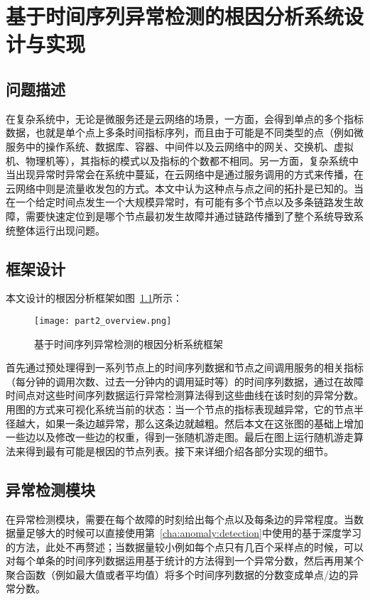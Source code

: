 
\chapter{基于时间序列异常检测的根因分析系统设计与实现}
\label{cha:root:cause:analysis}
\section{问题描述}
在复杂系统中，无论是微服务还是云网络的场景，一方面，会得到单点的多个指标数据，也就是单个点上多条时间指标序列，而且由于可能是不同类型的点（例如微服务中的操作系统、数据库、容器、中间件以及云网络中的网关、交换机、虚拟机、物理机等），其指标的模式以及指标的个数都不相同。另一方面，复杂系统中当出现异常时异常会在系统中蔓延，在云网络中是通过服务调用的方式来传播，在云网络中则是流量收发包的方式。本文中认为这种点与点之间的拓扑是已知的。当在一个给定时间点发生一个大规模异常时，有可能有多个节点以及多条链路发生故障，需要快速定位到是哪个节点最初发生故障并通过链路传播到了整个系统导致系统整体运行出现问题。

\section{框架设计}
本文设计的根因分析框架如图~\ref{fig:part2-overview}所示：
\begin{figure}[htbp]
    \centering
    \texttt{[image: part2\_overview.png]}
    \caption{基于时间序列异常检测的根因分析系统框架}
    \label{fig:part2-overview}
  \end{figure}

首先通过预处理得到一系列节点上的时间序列数据和节点之间调用服务的相关指标（每分钟的调用次数、过去一分钟内的调用延时等）的时间序列数据，通过在故障时间点对这些时间序列数据运行异常检测算法得到这些曲线在该时刻的异常分数。用图的方式来可视化系统当前的状态：当一个节点的指标表现越异常，它的节点半径越大，如果一条边越异常，那么这条边就越粗。然后本文在这张图的基础上增加一些边以及修改一些边的权重，得到一张随机游走图。最后在图上运行随机游走算法来得到最有可能是根因的节点列表。接下来详细介绍各部分实现的细节。
\section{异常检测模块}
\label{sec:anomaly:detection}
在异常检测模块，需要在每个故障的时刻给出每个点以及每条边的异常程度。当数据量足够大的时候可以直接使用第~\ref{cha:anomaly:detection}中使用的基于深度学习的方法，此处不再赘述；当数据量较小例如每个点只有几百个采样点的时候，可以对每个单条的时间序列数据运用基于统计的方法得到一个异常分数，然后再用某个聚合函数（例如最大值或者平均值）将多个时间序列数据的分数变成单点/边的异常分数。

